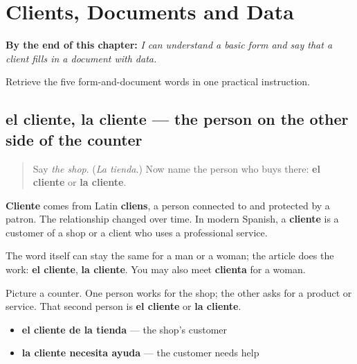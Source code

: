 
\chapter{Clients, Documents and Data}
\label{ch:cliente-documento-dato-impreso-rellenar}

\begin{chapteropening}
\textbf{By the end of this chapter:} \emph{I can understand a basic form and say that a client fills in a document with data.}

Retrieve the five form-and-document words in one practical instruction.
\end{chapteropening}

\section[el cliente, la cliente]{el cliente, la cliente — the person on the other side of the counter}

\label{lesson:ES-C406-cliente}



\begin{quote}
Say \emph{the shop}. (\emph{La tienda}.) Now name the person who buys there: \textbf{el cliente} or \textbf{la cliente}.
\end{quote}

\begin{cousinweb}
\textbf{Cliente} comes from Latin \textbf{cliens}, a person connected to and protected by a patron. The relationship changed over time. In modern Spanish, a \textbf{cliente} is a customer of a shop or a client who uses a professional service.

The word itself can stay the same for a man or a woman; the article does the work: \textbf{el cliente}, \textbf{la cliente}. You may also meet \textbf{clienta} for a woman.
\end{cousinweb}

\begin{grammarlens}[title={Grammar Lens: meaning in a scene}]
Picture a counter. One person works for the shop; the other asks for a product or service. That second person is \textbf{el cliente} or \textbf{la cliente}.

\begin{itemize}
\raggedright
  \item \textbf{el cliente de la tienda} — the shop's customer
  \item \textbf{la cliente necesita ayuda} — the customer needs help
\end{itemize}
\end{grammarlens}


